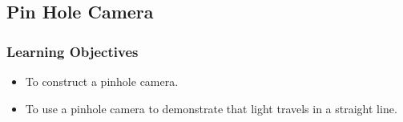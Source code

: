 %


\subsection{Pin Hole Camera}

\subsubsection*{Learning Objectives}
\begin{itemize}
\item{To construct a pinhole camera.}
\item{To use a pinhole camera to demonstrate that light travels in a straight line.}
\end{itemize}

